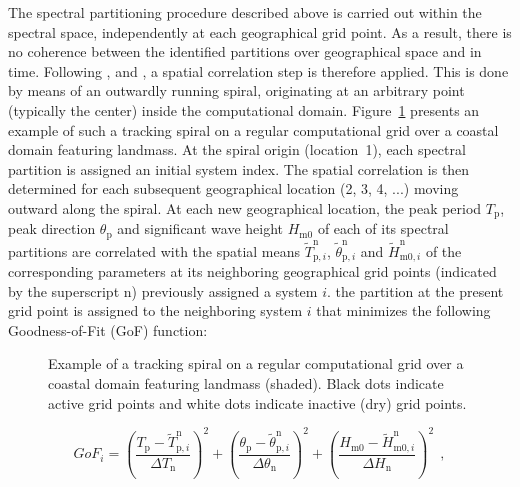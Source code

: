 The spectral partitioning procedure described above is carried out within 
the spectral space, independently at each geographical grid point. As a 
result, there is no coherence between the identified partitions over 
geographical space and in time. Following \cite{art:VMH97}, \cite{art:HP01} 
and \cite{pro:DHL09}, a spatial correlation step is therefore applied. 
This is done by means of an outwardly running spiral, originating at an 
arbitrary point (typically the center) inside the computational domain. 
Figure~\ref{fig:wavetrack} presents an example of such a tracking spiral on a regular 
computational grid over a coastal domain featuring landmass. At the spiral 
origin (location~1), each spectral partition is assigned an initial system 
index. The spatial correlation is then determined for each subsequent 
geographical location (2, 3, 4, ...) moving outward along the spiral. 
At each new geographical location, the peak period $T_\mathrm{p}$, peak 
direction $\theta_\mathrm{p}$ and significant wave height $H_\mathrm{m0}$ 
of each of its spectral partitions are correlated with the spatial means 
$\tilde{T}^\mathrm{n}_{\mathrm{p},i}$, $\tilde{\theta}^\mathrm{n}_{\mathrm{p},i}$ 
and $\tilde{H}^\mathrm{n}_{\mathrm{m0},i}$ of the corresponding parameters 
at its neighboring geographical grid points (indicated by the superscript 
$\mathrm{n}$) previously assigned a system $i$. the partition at the present 
grid point is assigned to the neighboring system $i$ that minimizes the 
following Goodness-of-Fit (GoF) function:

\begin{figure} \begin{center}
\caption{Example of a tracking spiral on a regular computational grid 
over a coastal domain featuring landmass (shaded). Black dots indicate 
active grid points and white dots indicate inactive (dry) grid points.}
         \label{fig:wavetrack} \botline
\end{center}
\end{figure}

\begin{equation}
    GoF_{i} = {\left( \frac{T_\mathrm{p} - \tilde{T}^\mathrm{n}_{\mathrm{p},i}}{\Delta T_\mathrm{n}} \right)}^2 + 
                     {\left( \frac{\theta_\mathrm{p} - \tilde{\theta}^\mathrm{n}_{\mathrm{p},i}}{\Delta\theta_\mathrm{n}} \right)}^2 +
                     {\left( \frac{H_\mathrm{m0} - \tilde{H}^\mathrm{n}_{\mathrm{m0},i}}{\Delta H_\mathrm{n}} \right)}^2\ \ ,
\label{eq:grdgof}
\end{equation} 

